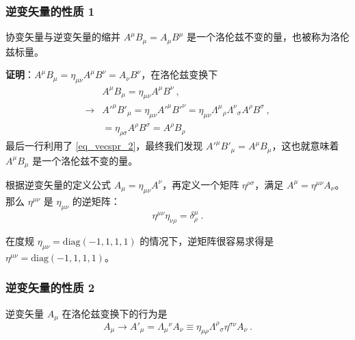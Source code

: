 \subsubsection{逆变矢量的性质 1}
\begin{lemma}{}
协变矢量与逆变矢量的缩并 $A^\mu B_\mu=A_\mu B^\mu$ 是一个洛伦兹不变的量，也被称为洛伦兹标量。
\end{lemma}
\textbf{证明}：$A^\mu B_\mu = \eta_{\mu\nu}A^\mu B^\nu=A_\nu B^\nu$，在洛伦兹变换下 \begin{equation}
\begin{aligned}
&A^\mu B_\mu = \eta_{\mu\nu}A^\mu B^\nu ~,\\
\rightarrow &{A'}^\mu {B'}_\mu =\eta_{\mu\nu}{A'}^\mu {B'}^\nu = \eta_{\mu\nu}\Lambda^{\mu}{}_\rho\Lambda^\nu{}_\sigma A^\rho  B^\sigma~,\\
&=\eta_{\rho\sigma}A^\rho B^\sigma = A^\rho B_\rho
\end{aligned}
\end{equation}
最后一行利用了 \autoref{eq_vecspr_2}，最终我们发现 ${A'}^\mu {B'}_\mu = A^\mu B_\mu $，这也就意味着 $A^\mu B_\mu$ 是一个洛伦兹不变的量。
\begin{lemma}{}
根据逆变矢量的定义公式 $A_\mu = \eta_{\mu\nu}A^\nu$，再定义一个矩阵 $\eta^{\rho\sigma}$，满足 $A^\mu = \eta^{\mu\nu} A_\nu$。那么 $\eta^{\mu\nu}$ 是 $\eta_{\mu\nu}$ 的逆矩阵：
\begin{equation}
\eta^{\mu\nu}\eta_{\nu\rho}=\delta^{\mu}_\rho~.
\end{equation}
\end{lemma}
在度规 $\eta_{\mu\nu} = \mathrm{diag}(-1,1,1,1)$ 的情况下，逆矩阵很容易求得是 $\eta^{\mu\nu} = \mathrm{diag}(-1,1,1,1)$。
\subsubsection{逆变矢量的性质 2}
\begin{lemma}{}
逆变矢量 $A_\mu$ 在洛伦兹变换下的行为是
\begin{equation}
A_\mu \rightarrow  A'_\mu = \Lambda_{\mu}{}^\nu A_\nu\equiv\eta_{\mu\rho}\Lambda^{\rho}{}_\sigma \eta^{\sigma\nu} A_\nu~.
\end{equation}
\end{lemma}